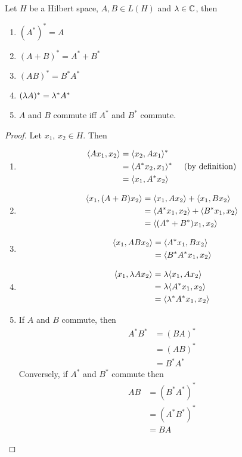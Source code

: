 \documentclass{book}
\begin{document}
\begin{ex} \lex{}
	Let $H$ be a Hilbert space, $A, B \in L(H)$ and $\lambda \in \mathbb{C}$, then \begin{enumerate}
		\item $(A^{*})^{*} = A$
		\item $(A + B)^{*} = A^{*} + B^{*}$
		\item $(AB)^{*} = B^{*}A^{*}$
		\item $(\lambda A)^{*} = \lambda^*A^{*}$
		\item $A$ and $B$ commute iff $A^{*}$ and $B^{*}$ commute.
	\end{enumerate}
\end{ex}

\begin{proof} Let $x_1$, $x_2 \in H$. Then
	\begin{enumerate}
		\item 
		\begin{align*}
			\langle A x_1 , x_2 \rangle
			&= \langle x_2 , A x_1 \rangle^*\\
			&= \langle A^{*}x_2 ,  x_1 \rangle^* \hspace{.5cm} \text{(by definition)}\\
			&= \langle  x_1 , A^{*}x_2 \rangle
		\end{align*}
		\item 
		\begin{align*}
			\langle x_1 , (A+B) x_2 \rangle 
			&= \langle x_1 , A x_2 \rangle + \langle x_1 , B x_2 \rangle \\
			&= \langle A^{*} x_1 , x_2 \rangle + \langle B^{*} x_1 , x_2 \rangle \\
			&= \langle (A^{*} + B^{*})  x_1 , x_2 \rangle  \\
		\end{align*}
		\item 
		\begin{align*}
			\langle x_1 , AB x_2 \rangle  
			&= \langle A^{*}x_1 , B x_2 \rangle \\
			&= \langle B^{*} A^{*} x_1 , x_2 \rangle 
		\end{align*}
		\item 
		\begin{align*}
			\langle x_1 , \lambda A x_2 \rangle 
			&= \lambda \langle x_1 , A x_2 \rangle \\
			&= \lambda \langle A^{*}x_1 , x_2 \rangle \\
			&= \langle \lambda^* A^{*} x_1 , x_2 \rangle 
		\end{align*}
		\item If $A$ and $B$ commute, then 
		\begin{align*}
			A^{*}B^{*}
			&= (BA)^{*} \\
			&= (AB)^{*} \\
			&= B^{*}A^{*}
		\end{align*}
		Conversely, if $A^{*}$ and $B^{*}$ commute then 
		\begin{align*}
			AB
			&= (B^{*}A^{*})^{*} \\
			&= (A^{*}B^{*})^{*} \\
			&= BA
		\end{align*}
	\end{enumerate}
\end{proof}
\end{document}

